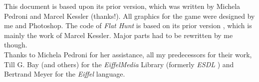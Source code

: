 This document is based upon its prior version, which was written by Michela Pedroni and Marcel Kessler (thanks!). All graphics for the game were designed by me and Photoshop. The code of \emph{Flat Hunt} is based on its prior version \cite{mk04}, which is mainly the work of Marcel Kessler. Major parts had to be rewritten by me though.\\

Thanks to Michela Pedroni for her assistance, all my predecessors for their work, Till G. Bay (and others) for the \emph{EiffelMedia} Library (formerly \emph{ESDL} \cite{dgtgb03}\cite{dgbb04}) and Bertrand Meyer for the \emph{Eiffel} language. 

